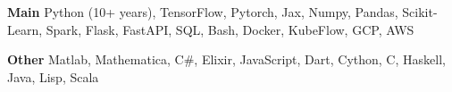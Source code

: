 \textbf{Main}
Python (10+ years), TensorFlow, Pytorch, Jax, Numpy, Pandas, Scikit-Learn, Spark, Flask, FastAPI, SQL, Bash, Docker, KubeFlow, GCP, AWS

\textbf{Other}
Matlab, Mathematica, C\#, Elixir, JavaScript, Dart, Cython, C, Haskell, Java, Lisp, Scala